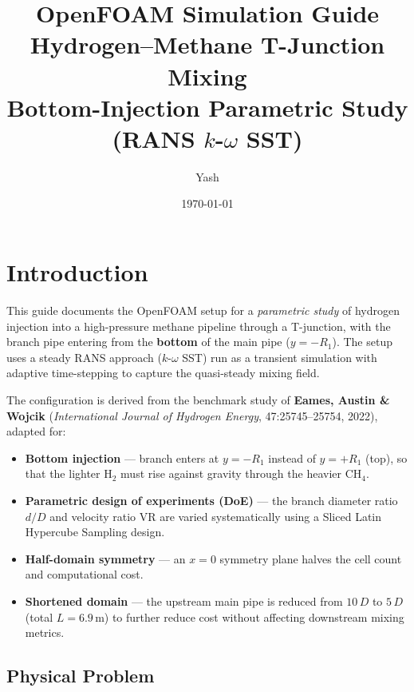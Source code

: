 \documentclass[12pt,a4paper]{report}
\title{\textbf{OpenFOAM Simulation Guide}\\[6pt]
       \Large Hydrogen--Methane T-Junction Mixing\\
       Bottom-Injection Parametric Study (RANS $k$-$\omega$ SST)}
\author{Yash}
\date{\today}
\begin{document}
\maketitle
\thispagestyle{empty}

\tableofcontents
\newpage


\chapter{Introduction}
\label{ch:intro}

This guide documents the OpenFOAM setup for a \emph{parametric study}
of hydrogen injection into a high-pressure methane pipeline through a
T-junction, with the branch pipe entering from the \textbf{bottom} of
the main pipe ($y = -R_1$).  The setup uses a steady RANS approach
($k$-$\omega$ SST) run as a transient simulation with adaptive
time-stepping to capture the quasi-steady mixing field.

The configuration is derived from the benchmark study of
\textbf{Eames, Austin \& Wojcik} (\emph{International Journal of
Hydrogen Energy}, 47:25745--25754, 2022), adapted for:
\begin{itemize}
  \item \textbf{Bottom injection} --- branch enters at $y = -R_1$
        instead of $y = +R_1$ (top), so that the lighter H$_2$ must
        rise against gravity through the heavier CH$_4$.
  \item \textbf{Parametric design of experiments (DoE)} --- the branch
        diameter ratio $d/D$ and velocity ratio VR are varied
        systematically using a Sliced Latin Hypercube Sampling design.
  \item \textbf{Half-domain symmetry} --- an $x = 0$ symmetry plane
        halves the cell count and computational cost.
  \item \textbf{Shortened domain} --- the upstream main pipe is
        reduced from $10\,D$ to $5\,D$ (total $L = 6.9$\,m) to
        further reduce cost without affecting downstream mixing
        metrics.
\end{itemize}

\section{Physical Problem}
\end{document}
